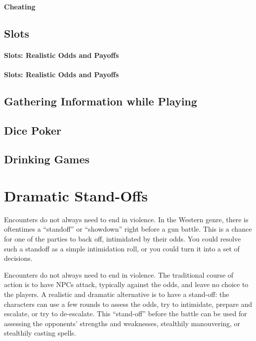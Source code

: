 \documentclass[twocolumn]{dndbook}
\begin{document}
\paragraph{Cheating}
\subsection{Slots}

\paragraph{Slots: Realistic Odds and Payoffs}

\paragraph{Slots: Realistic Odds and Payoffs}

\subsection{Gathering Information while Playing}

\subsection{Dice Poker}


\subsection{Drinking Games}

\section{Dramatic Stand-Offs}
\label{sec:dramatic_standoff}


Encounters do not always need to end in violence.
In the Western genre, there is oftentimes a ``standoff'' or ``showdown'' right before a gun battle.
This is a chance for one of the parties to back off, intimidated by their odds.
You could resolve such a standoff as a simple intimidation roll, or you could turn it into a set of decisions.\par

\begin{emphasisParagraph}
	Encounters do not always need to end in violence.
	The traditional course of action is to have NPCs attack, typically against the odds, and leave no choice to the players.
	A realistic and dramatic alternative is to have a stand-off: the characters can use a few rounds to assess the odds,
	try to intimidate, prepare and escalate, or try to de-escalate.
	This ``stand-off'' before the battle can be used for assessing the opponents' strengths and weaknesses,
	stealthily manouvering, or stealthily casting spells.
\end{emphasisParagraph}
\end{document}
